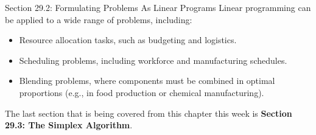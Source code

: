 \begin{notes}{Section 29.2: Formulating Problems As Linear Programs}
    Linear programming can be applied to a wide range of problems, including:
    \begin{itemize}
        \item Resource allocation tasks, such as budgeting and logistics.
        \item Scheduling problems, including workforce and manufacturing schedules.
        \item Blending problems, where components must be combined in optimal proportions (e.g., in food production or chemical manufacturing).
    \end{itemize}    
\end{notes}

The last section that is being covered from this chapter this week is \textbf{Section 29.3: The Simplex Algorithm}.

